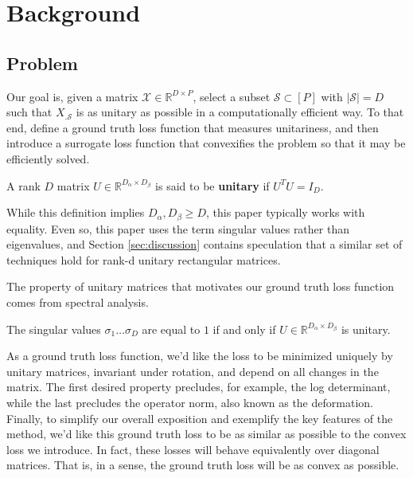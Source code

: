 \documentclass[a4paper,11pt]{article}
\begin{document}
\section{Background}

\subsection{Problem}

Our goal is, given a matrix $\mathcal X \in \mathbb R^{D \times P}$, select a subset $\mathcal S \subset [P]$ with $|\mathcal S| = D$ such that $X_{. \mathcal S}$ is as unitary as possible in a computationally efficient way.
To that end, define a ground truth loss function that measures unitariness, and then introduce a surrogate loss function that convexifies the problem so that it may be efficiently solved.

\begin{definition}[Unitary]
A rank $D$ matrix $U \in \mathbb R^{D_\alpha \times D_\beta}$ is said to be \textbf{unitary} if $U^TU = I_D$.
\end{definition}

While this definition implies $D_\alpha, D_\beta \geq D$, this paper typically works with equality.
Even so, this paper uses the term singular values rather than eigenvalues, and Section \ref{sec:discussion} contains speculation that a similar set of techniques hold for rank-d unitary rectangular matrices.

The property of unitary matrices that motivates our ground truth loss function comes from spectral analysis.
\begin{proposition}
\label{prop:unitary_spectrum}
The singular values $\sigma_1 \dots \sigma_D$ are equal to $1$ if and only if $U \in \mathbb{R}^{D_\alpha \times D_\beta}$ is unitary.
\end{proposition}

As a ground truth loss function, we'd like the loss to be minimized uniquely by unitary matrices, invariant under rotation, and depend on all changes in the matrix.
The first desired property precludes, for example, the log determinant, while the last precludes the operator norm, also known as the deformation. %
Finally, to simplify our overall exposition and exemplify the key features of the method, we'd like this ground truth loss to be as similar as possible to the convex loss we introduce.
In fact, these losses will behave equivalently over diagonal matrices.
That is, in a sense, the ground truth loss will be as convex as possible.
\end{document}
